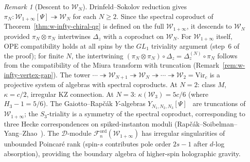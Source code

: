 \documentclass[11pt,reqno]{amsart}
\theoremstyle{definition}
\theoremstyle{remark}
\newtheorem{remark}[theorem]{Remark}
\newcommand{\cD}{\mathcal{D}}
\newcommand{\cF}{\mathcal{F}}
\newcommand{\cW}{\mathcal{W}}
\numberwithin{equation}{section}
\begin{document}
\begin{remark}[Descent to $\cW_N$]
\label{rem:w-infty-descent}
Drinfeld--Sokolov reduction gives
$\pi_N \colon \cW_{1+\infty}[\Psi]
\twoheadrightarrow \cW_N$
for each $N \geq 2$. Since the spectral coproduct of
Theorem~\ref{thm:w-infty-chiral-qg} is defined
on the full $\cW_{1+\infty}$, it descends to $\cW_N$
provided $\pi_N \otimes \pi_N$ intertwines $\Delta_z$ with
a coproduct on $\cW_N$. For $\cW_{1+\infty}$ itself,
OPE compatibility holds at all spins by the $GL_1$
triviality argument (step~6 of the proof); for finite
$N$, the intertwining $(\pi_N \otimes \pi_N) \circ
\Delta_z = \Delta_z^{(N)} \circ \pi_N$ follows from the
compatibility of the Miura transform with truncation
(Remark~\ref{rem:w-infty-vertex-gap}).
The tower
$\cdots \twoheadrightarrow \cW_{N+1}
\twoheadrightarrow \cW_N
\twoheadrightarrow \cdots
\twoheadrightarrow \cW_2 = \mathrm{Vir}_c$
is a projective system of algebras with spectral
coproducts.
At $N = 2$: class $M$, $\kappa = c/2$, irregular KZ
connection. At $N = 3$: $\kappa(\cW_3) = 5c/6$ (where
$H_3 - 1 = 5/6$).
The Gaiotto--Rap\v{c}\'ak $Y$-algebras
$Y_{N_1,N_2,N_3}[\Psi]$~\cite{gaiotto-rapchak} are truncations of
$\cW_{1+\infty}$; the $S_3$-triality is a symmetry
of the spectral coproduct, corresponding to three Hecke
correspondences on spiked-instanton moduli
(Rap\v{c}\'ak--Soibelman--Yang--Zhao~\cite{RSYZ20}).
The $\cD$-module $\cF_n^{\mathrm{ord}}(\cW_{1+\infty})$
has irregular singularities of unbounded Poincar\'e rank
(spin-$s$ contributes pole order $2s - 1$ after $d$-log
absorption), providing the boundary algebra of higher-spin
holographic gravity.
\end{remark}
\end{document}
